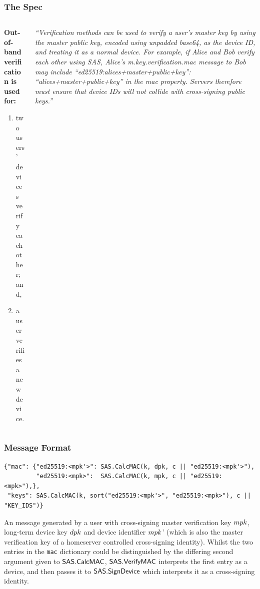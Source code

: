 \documentclass[aspectratio=169]{beamer}
\begin{document}
\begin{frame}[fragile]
  \frametitle{The Spec}

  \begin{columns}
    \begin{column}{0.4\columnwidth}
      \textbf{Out-of-band verification is used for:}
      \begin{enumerate}
      \item two users' devices verify each other; and,
      \item a user verifies a new device.
      \end{enumerate}

   \end{column}
    \begin{column}{0.6\columnwidth}

      \textit{``Verification methods can be used to verify a user’s master key by using the master public key, encoded using unpadded base64, as the device ID, and treating it as a normal device. For example, if Alice and Bob verify each other using SAS, Alice’s m.key.verification.mac message to Bob may include ``ed25519:alices+master+public+key'': ``alices+master+public+key'' in the mac property. Servers therefore must ensure that device IDs will not collide with cross-signing public keys.''}

  \end{column}
\end{columns}

\framebreak{}

\end{frame}

\begin{frame}[fragile]
  \frametitle{Message Format}

  \begin{verbatim}
{"mac": {"ed25519:<mpk'>": SAS.CalcMAC(k, dpk, c || "ed25519:<mpk'>"),
         "ed25519:<mpk>":  SAS.CalcMAC(k, mpk, c || "ed25519:<mpk>"),},
 "keys": SAS.CalcMAC(k, sort("ed25519:<mpk'>", "ed25519:<mpk>"), c || "KEY_IDS")}
  \end{verbatim}

    An \MsgTypeVerificationMAC{} message generated by a user with cross-signing master verification key $\MasterPK$, long-term device key $\DevicePK$ and device identifier $\MasterPK$' (which is also the master verification key of a homeserver controlled cross-signing identity).
    Whilst the two entries in the \texttt{mac} dictionary could be distinguished by the differing second argument given to $\mathsf{SAS}.\mathsf{CalcMAC}$, $\mathsf{SAS}.\mathsf{VerifyMAC}$ interprets the first entry as a device, and then passes it to $\mathsf{SAS}.\mathsf{SignDevice}$ which interprets it as a cross-signing identity.

\end{frame}
\end{document}
